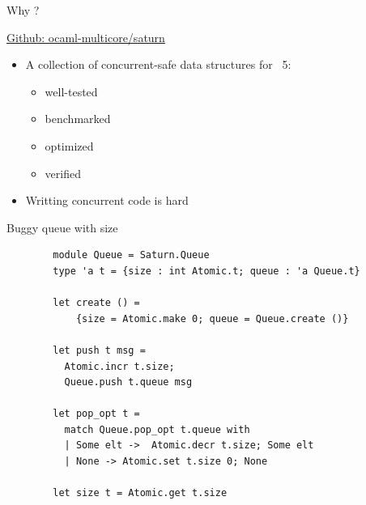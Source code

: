 \begin{frame}{Why \Saturn ?}
    \hfill\small{\href{https://github.com/ocaml-multicore/saturn}{Github: ocaml-multicore/saturn}
\vfill
    \begin{itemize}[label=$\bullet$]
        \item A collection of concurrent-safe data structures for \OCaml~5: 
        \begin{itemize}[label=$\diamond$]
            \item well-tested
            \item benchmarked
            \item optimized
            \item verified
        \end{itemize}
        \item<2-> Writting concurrent code is hard 
    \end{itemize}
    }
    \vfill
\end{frame}





\begin{frame}[fragile]{Buggy queue with size}     
    \begin{lstlisting}
        module Queue = Saturn.Queue 
        type 'a t = {size : int Atomic.t; queue : 'a Queue.t}

        let create () = 
            {size = Atomic.make 0; queue = Queue.create ()}
        
        let push t msg =
          Atomic.incr t.size;
          Queue.push t.queue msg
        
        let pop_opt t =
          match Queue.pop_opt t.queue with
          | Some elt ->  Atomic.decr t.size; Some elt
          | None -> Atomic.set t.size 0; None
        
        let size t = Atomic.get t.size
    \end{lstlisting}
\end{frame}


